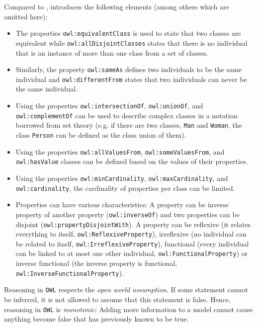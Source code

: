Compared to ,  introduces the following elements (among others which are omitted here):

\begin{itemize}
  \item The properties \texttt{owl:equivalentClass} is used to state that two classes are equivalent while \texttt{owl:allDisjointClasses} states that there is no individual that is an instance of more than one class from a set of classes.
  \item Similarly, the property \texttt{owl:sameAs} defines two individuals to be the same individual and \texttt{owl:differentFrom} states that two individuals can never be the same individual.
  \item Using the properties \texttt{owl:intersectionOf}, \texttt{owl:unionOf}, and \texttt{owl:complementOf} can be used to describe complex classes in a notation borrowed from set theory (e.g. if there are two classes, \texttt{Man} and \texttt{Woman}, the class \texttt{Person} can be defined as the class union of them).
  \item Using the properties \texttt{owl:allValuesFrom}, \texttt{owl:someValuesFrom}, and \texttt{owl:hasValue} classes can be defined based on the values of their properties.
  \item Using the properties \texttt{owl:minCardinality}, \texttt{owl:maxCardinality}, and \texttt{owl:cardinality}, the cardinality of properties per class can be limited.
  \item Properties can have various characteristics: A property can be inverse property of another property (\texttt{owl:inverseOf}) and two properties can be disjoint (\texttt{owl:propertyDisjointWith}). A property can be reflexive (it relates everything to itself, \texttt{owl:ReflexiveProperty}), irreflexive (no individual can be related to itself, \texttt{owl:IrreflexiveProperty}), functional (every individual can be linked to at most one other individual, \texttt{owl:FunctionalProperty}) or inverse functional (the inverse property is functional, \texttt{owl:InverseFunctionalProperty}).
\end{itemize}

Reasoning in \texttt{OWL} respects the \emph{open world assumption}. If some statement cannot be inferred, it is not allowed to assume that this statement is false. Hence, reasoning in \texttt{OWL} is \emph{monotonic}: Adding more information to a model cannot cause anything become false that has previously known to be true.

